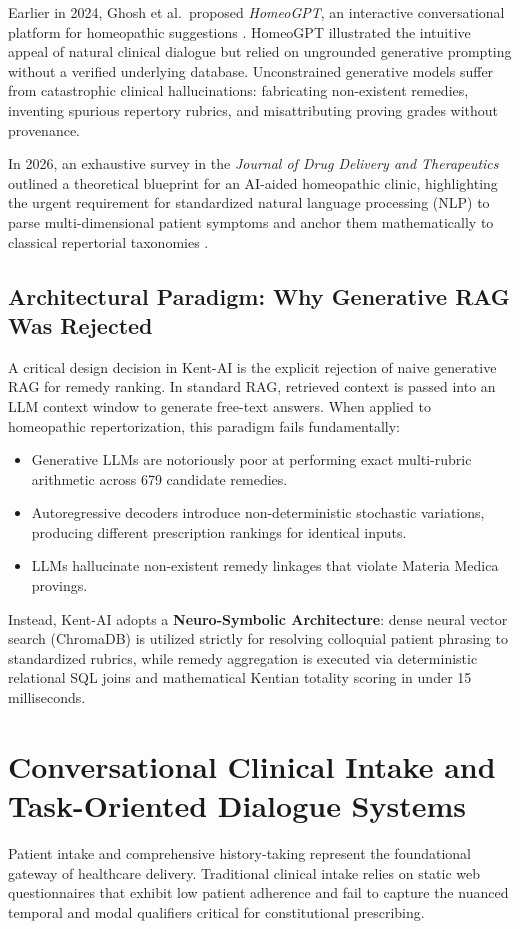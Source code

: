 \begin{sloppypar}
Earlier in 2024, Ghosh et al.~proposed \emph{HomeoGPT}, an interactive conversational platform for homeopathic suggestions \cite{Ghosh2024}. HomeoGPT illustrated the intuitive appeal of natural clinical dialogue but relied on ungrounded generative prompting without a verified underlying database. Unconstrained generative models suffer from catastrophic clinical hallucinations: fabricating non-existent remedies, inventing spurious repertory rubrics, and misattributing proving grades without provenance.

In 2026, an exhaustive survey in the \emph{Journal of Drug Delivery and Therapeutics} outlined a theoretical blueprint for an AI-aided homeopathic clinic, highlighting the urgent requirement for standardized natural language processing (NLP) to parse multi-dimensional patient symptoms and anchor them mathematically to classical repertorial taxonomies \cite{JDDT2026}.

\subsection{Architectural Paradigm: Why Generative RAG Was Rejected}
A critical design decision in Kent-AI is the explicit rejection of naive generative RAG for remedy ranking. In standard RAG, retrieved context is passed into an LLM context window to generate free-text answers. When applied to homeopathic repertorization, this paradigm fails fundamentally:
\begin{itemize}
    \item Generative LLMs are notoriously poor at performing exact multi-rubric arithmetic across 679 candidate remedies.
    \item Autoregressive decoders introduce non-deterministic stochastic variations, producing different prescription rankings for identical inputs.
    \item LLMs hallucinate non-existent remedy linkages that violate Materia Medica provings.
\end{itemize}
Instead, Kent-AI adopts a \textbf{Neuro-Symbolic Architecture}: dense neural vector search (ChromaDB) is utilized strictly for resolving colloquial patient phrasing to standardized rubrics, while remedy aggregation is executed via deterministic relational SQL joins and mathematical Kentian totality scoring in under 15 milliseconds.

\section{Conversational Clinical Intake and Task-Oriented Dialogue Systems}
Patient intake and comprehensive history-taking represent the foundational gateway of healthcare delivery. Traditional clinical intake relies on static web questionnaires that exhibit low patient adherence and fail to capture the nuanced temporal and modal qualifiers critical for constitutional prescribing.


\end{sloppypar}
